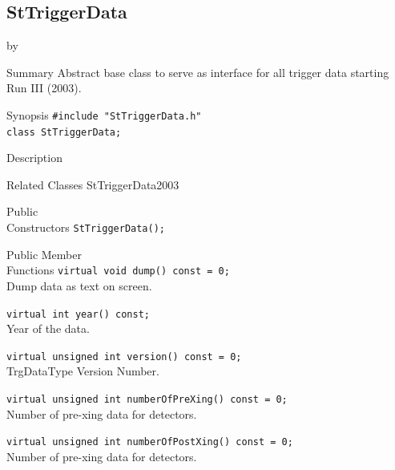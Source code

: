 \documentclass[twoside]{article}
\newcommand{\entrylabel}[1]{\mbox{\textbf{{#1}}}\hfil}%
\newenvironment{entry}
{\begin{list}{}%
    {\renewcommand{\makelabel}{\entrylabel}%
     \setlength{\labelwidth}{90pt}%
     \setlength{\leftmargin}{\labelwidth}
     \advance\leftmargin by \labelsep%
      }%
    }%
  {\end{list}}
\newcommand{\Entrylabel}[1]%
{\raisebox{0pt}[1ex][0pt]{\makebox[\labelwidth][l]%
    {\parbox[t]{\labelwidth}{\hspace{0pt}\textbf{{#1}}}}}}
\newenvironment{Entry}%
{\renewcommand{\entrylabel}{\Entrylabel}\begin{entry}}%
  {\end{entry}}
\begin{document}
\subsection{StTriggerData}
\label{sec:StTriggerData}
\begin{Entry}
\item[Summary] Abstract base class to serve as interface for all trigger data starting Run III (2003). 
\item[Synopsis]
    \verb+#include "StTriggerData.h"+\\
    \verb+class StTriggerData;+\\
\item[Description]
\item[Related Classes] StTriggerData2003
\item[Public\\ Constructors]
    \verb+StTriggerData();+\\
\item[Public Member\\ Functions]
    \verb+virtual void dump() const = 0;+\\
    Dump data as text on screen.
    
    \verb+virtual int year() const;+\\
    Year of the data.
    
    \verb+virtual unsigned int version() const = 0;+\\
    TrgDataType Version Number. 

    \verb+virtual unsigned int numberOfPreXing() const = 0;+\\
    Number of pre-xing data for detectors.
    
    \verb+virtual unsigned int numberOfPostXing() const = 0;+\\
    Number of pre-xing data for detectors.
     

\end{Entry}
\end{document}
